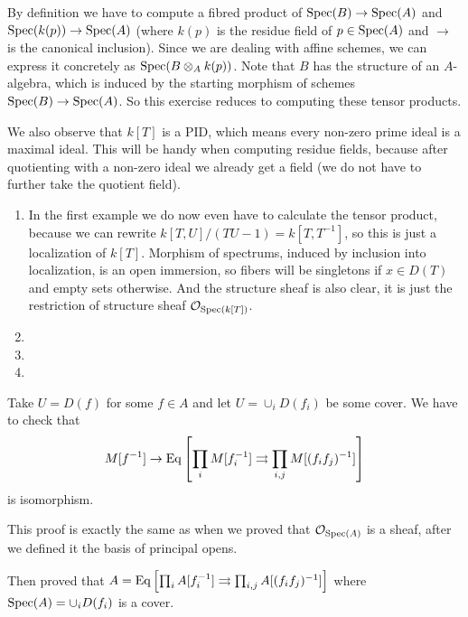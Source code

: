 \begin{exercise}{3}
    By definition we have to compute a fibred product of $\operatorname{Spec}(B) \to \operatorname{Spec}(A)$
    and $\operatorname{Spec}(k(p)) \to \operatorname{Spec}(A)$ (where $k(p)$ is the residue field of $p \in
    \operatorname{Spec}(A)$ and $\to$ is the canonical inclusion). Since we are dealing with
    affine schemes, we can express it concretely as $\operatorname{Spec}(B \otimes_A k(p))$.
    Note that $B$ has the structure of an $A$-algebra, which is induced
    by the starting morphism of schemes $\operatorname{Spec}(B) \rightarrow \operatorname{Spec}(A)$.
    So this exercise reduces to computing these tensor products.
    
    We also observe that $k[T]$ is a PID, which means every non-zero prime ideal
    is a maximal ideal. This will be handy when computing residue fields,
    because after quotienting with a non-zero ideal we already get a field (we do
    not have to further take the quotient field).

    \begin{enumerate}
        \item{In the first example we do now even have to calculate the tensor
            product, because we can rewrite $k[T, U]/(TU - 1) = k[T, T^{-1}]$,
            so this is just a localization of $k[T]$. Morphism of spectrums,
            induced by inclusion into localization, is an open immersion, so
            fibers will be singletons if $x \in D(T)$ and empty sets otherwise.
            And the structure sheaf is also clear, it is just the restriction of
            structure sheaf $\mathcal{O}_{\operatorname{Spec}(k[T])}$.}
        \item{}
        \item{}
        \item{}
    \end{enumerate}
\end{exercise}

\begin{exercise}{4}
    Take $U = D(f)$ for some $f \in A$ and let $U = \cup_i D(f_i)$ be some
    cover. We have to check that 
    \begin{equation*}
        M[f^{-1}] \rightarrow \operatorname{Eq}\left[ \prod_i M[f^{-1}_i] \rightrightarrows
        \prod_{i, j} M[(f_i f_j)^{-1}]  \right]
    \end{equation*}
    is isomorphism.

    This proof is exactly the same as when we proved that
    $\mathcal{O}_{\operatorname{Spec}(A)}$ is a sheaf, after we defined it the basis of
    principal opens.

    Then proved that $A = \operatorname{Eq}\left[ \prod_i A[f^{-1}_i] \rightrightarrows
    \prod_{i, j} A[(f_i f_j)^{-1}]  \right]$ where $\operatorname{Spec}(A) = \cup_i
    D(f_i)$ is a cover.

\end{exercise}


